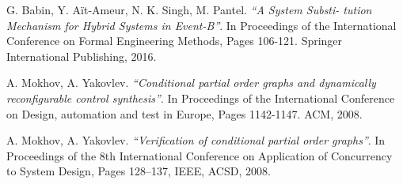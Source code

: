 \documentclass[conference]{IEEEtran}
\begin{document}
\begin{thebibliography}{10}
G. Babin, Y. A{\"i}t-Ameur, N. K. Singh, M. Pantel. \emph{``A System Substi-
tution Mechanism for Hybrid Systems in Event-B''}.  In Proceedings of the International
Conference on Formal Engineering Methods, Pages 106-121. Springer International Publishing, 2016.

A. Mokhov, A. Yakovlev. \emph{``Conditional partial order graphs and
dynamically reconfigurable control synthesis''}. In Proceedings of the International Conference on 
Design, automation and test in Europe, Pages 1142-1147. ACM, 2008.

A. Mokhov, A. Yakovlev.  \emph{``Verification of conditional partial order graphs''}.  In Proceedings of the 8th International Conference on Application of Concurrency to System Design, Pages 128–137, IEEE, ACSD, 2008.



	
\end{thebibliography}



\end{document}
